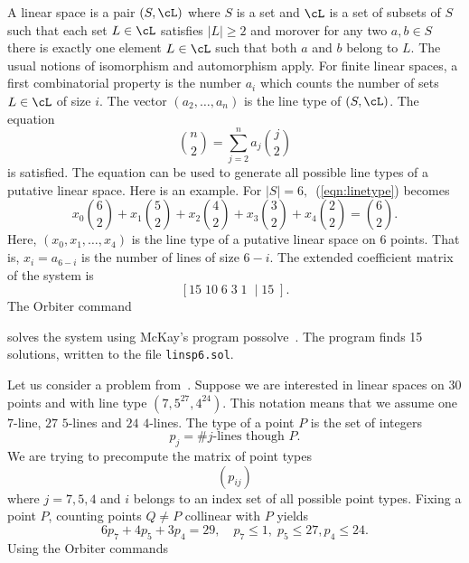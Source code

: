 
A linear space is a pair $(S,\cL)$ where $S$ is a set and $\cL$ is a set of subsets of $S$ such that 
each set $L \in \cL$ satisfies $|L| \ge 2$ and 
morover for any two $a,b \in S$ there is exactly one element $L \in \cL$
such that both $a$ and $b$ belong to $L.$ 
The usual notions of isomorphism and automorphism apply.
For finite linear spaces, 
a first combinatorial property is the number $a_i$ 
which counts the number of sets $L \in \cL$ of size $i.$ 
The vector $(a_2,\ldots,a_n)$ is the line type of $(S,\cL)$.
The equation 
\begin{equation}\label{eqn:linetype}
{n \choose 2} = \sum_{j=2}^n a_j {j \choose 2}
\end{equation}
is satisfied. 
The equation 
can be used to generate all possible line types of a putative linear space.
Here is an example. For $|S| = 6,$~(\ref{eqn:linetype}) becomes
$$
x_0 {6 \choose 2} + x_1 {5 \choose 2} + x_2 {4 \choose 2} + x_3 {3 \choose 2} + x_4 {2 \choose 2} = {6 \choose 2}.
$$
Here, $(x_0,x_1,\ldots,x_4)$ is the line type of a putative linear space on $6$ points. 
That is, $x_i = a_{6-i}$ is the number of lines of size $6-i.$
The extended coefficient matrix of the system is 
$$
\left[ 
15 \; 
10 \; 
6 \; 
3 \; 
1 \; 
\mid 
15 
\;
\right].
$$
The Orbiter command


solves the system using 
McKay's program possolve~\cite{Possolve}. 
The program finds 15 solutions, 
written to the file \verb'linsp6.sol'.


\bigskip

Let us consider a problem from~\cite{BettenBetten10}.
Suppose we are interested in linear spaces on 30 points and 
with line type $(7,5^{27},4^{24})$. 
This notation means that we assume 
one $7$-line, $27$ $5$-lines and $24$ $4$-lines. 
The type of a point $P$ is the set of integers 
$$
p_{j} = \# j\mbox{-lines though $P$}.
$$
We are trying to precompute the matrix of point types  
$$
(p_{ij})
$$
where $j=7,5,4$ and $i$ belongs to an index set of all possible point types.
Fixing a point $P$, counting points $Q \neq P$ collinear with $P$ yields
$$
6p_7 + 4p_5+3p_4 = 29, \quad p_7 \le 1, \; p_5 \le 27, p_4 \le 24.
$$
Using the Orbiter commands 


